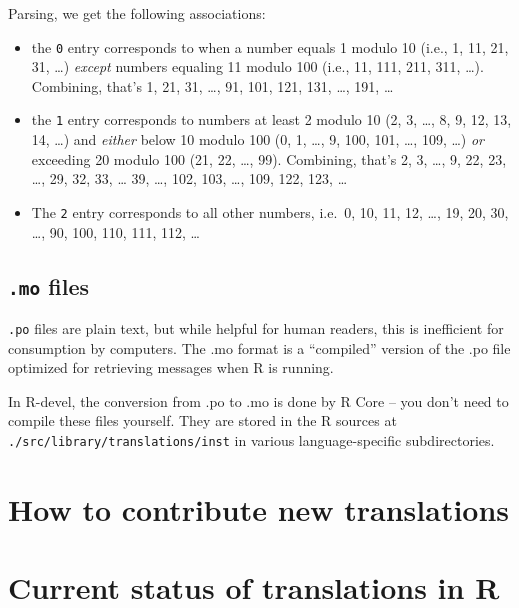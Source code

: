\documentclass[
]{book}
\providecommand{\tightlist}{%
  \setlength{\itemsep}{0pt}\setlength{\parskip}{0pt}}
\begin{document}
Parsing, we get the following associations:

\begin{itemize}
\tightlist
\item
  the \texttt{0} entry corresponds to when a number equals 1 modulo 10 (i.e., 1, 11, 21, 31, \ldots) \emph{except} numbers equaling
  11 modulo 100 (i.e., 11, 111, 211, 311, \ldots). Combining, that's 1, 21, 31, \ldots, 91, 101, 121, 131, \ldots, 191, \ldots{}
\item
  the \texttt{1} entry corresponds to numbers at least 2 modulo 10 (2, 3, \ldots, 8, 9, 12, 13, 14, \ldots) and \emph{either}
  below 10 modulo 100 (0, 1, \ldots, 9, 100, 101, \ldots, 109, \ldots) \emph{or} exceeding 20 modulo 100 (21, 22, \ldots, 99). Combining,
  that's 2, 3, \ldots, 9, 22, 23, \ldots, 29, 32, 33, \ldots{} 39, \ldots, 102, 103, \ldots, 109, 122, 123, \ldots{}
\item
  The \texttt{2} entry corresponds to all other numbers, i.e.~0, 10, 11, 12, \ldots, 19, 20, 30, \ldots, 90, 100, 110, 111, 112, \ldots{}
\end{itemize}

\hypertarget{mo-files}{%
\subsection{\texorpdfstring{\texttt{.mo} files}{.mo files}}\label{mo-files}}

\texttt{.po} files are plain text, but while helpful for human readers, this is inefficient for consumption by computers.
The .mo format is a ``compiled'' version of the .po file optimized for retrieving messages when R is running.

In R-devel, the conversion from .po to .mo is done by R Core -- you don't need to compile these files yourself.
They are stored in the R sources at \texttt{./src/library/translations/inst} in various language-specific subdirectories.

\hypertarget{how-to-contribute-new-translations}{%
\section{How to contribute new translations}\label{how-to-contribute-new-translations}}

\hypertarget{current-status-of-translations-in-r}{%
\section{Current status of translations in R}\label{current-status-of-translations-in-r}}
\end{document}

